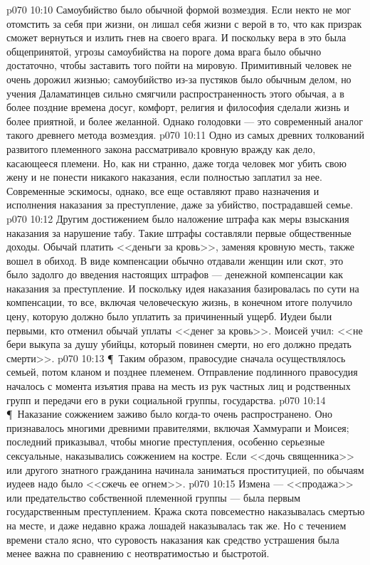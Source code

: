 \vs p070 10:10 Самоубийство было обычной формой возмездия. Если некто не мог отомстить за себя при жизни, он лишал себя жизни с верой в то, что как призрак сможет вернуться и излить гнев на своего врага. И поскольку вера в это была общепринятой, угрозы самоубийства на пороге дома врага было обычно достаточно, чтобы заставить того пойти на мировую. Примитивный человек не очень дорожил жизнью; самоубийство из\hyp{}за пустяков было обычным делом, но учения Даламатинцев сильно смягчили распространенность этого обычая, а в более поздние времена досуг, комфорт, религия и философия сделали жизнь и более приятной, и более желанной. Однако голодовки --- это современный аналог такого древнего метода возмездия.
\vs p070 10:11 Одно из самых древних толкований развитого племенного закона рассматривало кровную вражду как дело, касающееся племени. Но, как ни странно, даже тогда человек мог убить свою жену и не понести никакого наказания, если полностью заплатил за нее. Современные эскимосы, однако, все еще оставляют право назначения и исполнения наказания за преступление, даже за убийство, пострадавшей семье.
\vs p070 10:12 Другим достижением было наложение штрафа как меры взыскания наказания за нарушение табу. Такие штрафы составляли первые общественные доходы. Обычай платить <<деньги за кровь>>, заменяя кровную месть, также вошел в обиход. В виде компенсации обычно отдавали женщин или скот, это было задолго до введения настоящих штрафов --- денежной компенсации как наказания за преступление. И поскольку идея наказания базировалась по сути на компенсации, то все, включая человеческую жизнь, в конечном итоге получило цену, которую должно было уплатить за причиненный ущерб. Иудеи были первыми, кто отменил обычай уплаты <<денег за кровь>>. Моисей учил: <<не бери выкупа за душу убийцы, который повинен смерти, но его должно предать смерти>>.
\vs p070 10:13 \P\ Таким образом, правосудие сначала осуществлялось семьей, потом кланом и позднее племенем. Отправление подлинного правосудия началось с момента изъятия права на месть из рук частных лиц и родственных групп и передачи его в руки социальной группы, государства.
\vs p070 10:14 \P\ Наказание сожжением заживо было когда\hyp{}то очень распространено. Оно признавалось многими древними правителями, включая Хаммурапи и Моисея; последний приказывал, чтобы многие преступления, особенно серьезные сексуальные, наказывались сожжением на костре. Если <<дочь священника>> или другого знатного гражданина начинала заниматься проституцией, по обычаям иудеев надо было <<сжечь ее огнем>>.
\vs p070 10:15 Измена --- <<продажа>> или предательство собственной племенной группы --- была первым государственным преступлением. Кража скота повсеместно наказывалась смертью на месте, и даже недавно кража лошадей наказывалась так же. Но с течением времени стало ясно, что суровость наказания как средство устрашения была менее важна по сравнению с неотвратимостью и быстротой.
